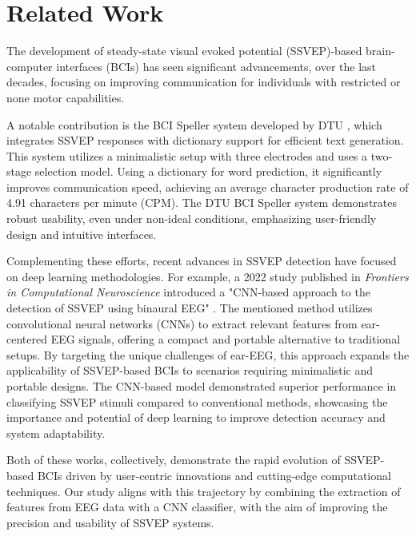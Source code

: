 \section{Related Work}

The development of steady-state visual evoked potential (SSVEP)-based brain-computer interfaces (BCIs) has seen significant advancements, over the last decades, focusing on improving communication for individuals with restricted or none motor capabilities.

A notable contribution is the BCI Speller system developed by DTU \cite{dtubcispeller}, which integrates SSVEP responses with dictionary support for efficient text generation. This system utilizes a minimalistic setup with three electrodes and uses a two-stage selection model. Using a dictionary for word prediction, it significantly improves communication speed, achieving an average character production rate of 4.91 characters per minute (CPM). The DTU BCI Speller system demonstrates robust usability, even under non-ideal conditions, emphasizing user-friendly design and intuitive interfaces.

Complementing these efforts, recent advances in SSVEP detection have focused on deep learning methodologies. For example, a 2022 study published in \textit{Frontiers in Computational Neuroscience} introduced a "CNN-based approach to the detection of SSVEP using binaural EEG" \cite{cnnbased}. The mentioned method utilizes convolutional neural networks (CNNs) to extract relevant features from ear-centered EEG signals, offering a compact and portable alternative to traditional setups. By targeting the unique challenges of ear-EEG, this approach expands the applicability of SSVEP-based BCIs to scenarios requiring minimalistic and portable designs. The CNN-based model demonstrated superior performance in classifying SSVEP stimuli compared to conventional methods, showcasing the importance and potential of deep learning to improve detection accuracy and system adaptability.

Both of these works, collectively, demonstrate the rapid evolution of SSVEP-based BCIs driven by user-centric innovations and cutting-edge computational techniques. Our study aligns with this trajectory by combining the extraction of features from EEG data with a CNN classifier, with the aim of improving the precision and usability of SSVEP systems.